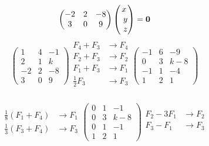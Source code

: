 \documentclass[../practica.root.tex]{subfiles}
\begin{document}
\begin{enumerate}
\[\begin{pmatrix}
                  -2 & 2 & -8 \\
                  3  & 0 & 9
              \end{pmatrix}
              \begin{pmatrix}
                  x \\ y \\ z
              \end{pmatrix}
              =
              \0
          \] \[
              \begin{pmatrix}
                  1  & 4 & -1 \\
                  2  & 1 & k  \\
                  -2 & 2 & -8 \\
                  3  & 0 & 9
              \end{pmatrix}
              \begin{array}{rl}
                  F_4 + F_3      & \to F_4 \\
                  F_2 + F_3      & \to F_2 \\
                  F_1 + F_3      & \to F_1 \\
                  \frac{1}{2}F_3 & \to F_3 \\
              \end{array}
              \begin{pmatrix}
                  -1 & 6 & -9  \\
                  0  & 3 & k-8 \\
                  -1 & 1 & -4  \\
                  1  & 2 & 1
              \end{pmatrix}
          \] \[
              \begin{array}{rl}
                  \frac{1}{8}(F_1 + F_4) & \to F_1 \\
                  \frac{1}{3}(F_3 + F_4) & \to F_3
              \end{array}
              \begin{pmatrix}
                  0 & 1 & -1  \\
                  0 & 3 & k-8 \\
                  0 & 1 & -1  \\
                  1 & 2 & 1
              \end{pmatrix}
              \begin{array}{rl}
                  F_2 - 3F_1 & \to F_2 \\
                  F_3 - F_1  & \to F_3 \\

\end{array}\]
\end{enumerate}
\end{document}
